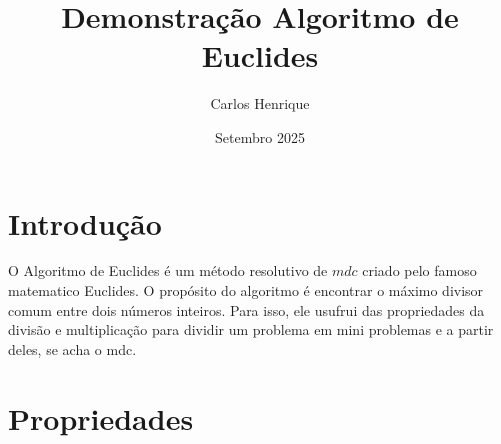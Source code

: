 \documentclass{article}
\title{Demonstração Algoritmo de Euclides}
\author{Carlos Henrique}
\date{Setembro 2025}
\begin{document}
    \maketitle

    \section{Introdução}
    O Algoritmo de Euclides é um método resolutivo de $mdc$ criado pelo famoso matematico Euclides. O propósito do algoritmo é encontrar o máximo divisor comum entre dois números inteiros. Para isso, ele usufrui das propriedades da divisão e multiplicação para dividir um problema em mini problemas e a partir deles, se acha o mdc.

    \section{Propriedades}
\end{document}
